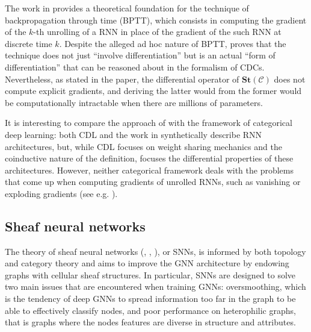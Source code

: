 \documentclass[11pt,a4paper,openright,twoside]{report}
\theoremstyle{plain}
\theoremstyle{definition}
\newcommand\dblquote[1]{\textquotedblleft #1\textquotedblright}
\begin{document}
The work in \cite{sprunger2019differentiable} provides a theoretical foundation for the technique of backpropagation through time (BPTT), which consists in computing the gradient of the $k$-th unrolling of a RNN in place of the gradient of the such RNN at discrete time $k$. Despite the alleged ad hoc nature of BPTT, \cite{sprunger2019differentiable} proves that the technique does not just \dblquote{involve differentiation} but is an actual \dblquote{form of differentiation} that can be reasoned about in the formalism of CDCs. Nevertheless, as stated in the paper, the differential operator of $\mathbf{St}(\mathcal{C})$ does not compute explicit gradients, and deriving the latter would from the former would be computationally intractable when there are millions of parameters. 


It is interesting to compare the approach of \cite{sprunger2019differentiable} with the framework of categorical deep learning: both CDL and the work in \cite{sprunger2019differentiable} synthetically describe RNN architectures, but, while CDL focuses on weight sharing mechanics and the coinductive nature of the definition, \cite{sprunger2019differentiable} focuses the differential properties of these architectures. However, neither categorical framework deals with the problems that come up when computing gradients of unrolled RNNs, such as vanishing or exploding gradients (see e.g. \cite{hanin2018neural}). 


\subsection{Sheaf neural networks}

The theory of sheaf neural networks (\cite{hansen2020sheaf}, \cite{bodnar2022neural}, \cite{zaghen2024nonlinear}), or SNNs, is informed by both topology and category theory and aims to improve the GNN architecture by endowing graphs with cellular sheaf structures. In particular, SNNs are designed to solve two main issues that are encountered when training GNNs: oversmoothing, which is the tendency of deep GNNs to spread information too far in the graph to be able to effectively classify nodes, and poor performance on heterophilic graphs, that is graphs where the nodes features are diverse in structure and attributes.
\end{document}
